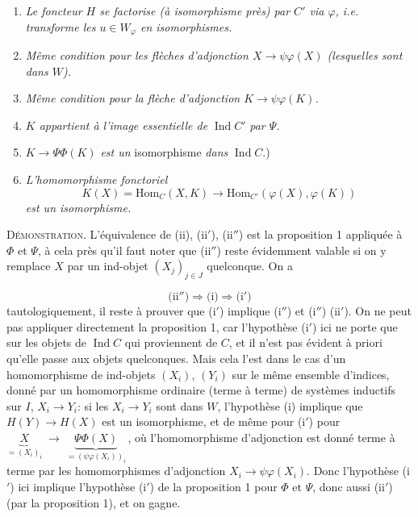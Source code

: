 \documentclass[11pt]{article}
\newcommand{\printedpage}[1]{\marginpar{\footnotesize p.~#1}}
\newcommand{\msp}[1]{\marginpar{\footnotesize [#1]}}
\newcommand{\Hom}{\mathrm{Hom}}
\newcommand{\Ind}{\operatorname{Ind}}
\begin{document}
\begin{enumerate}[label={}]
\item[(i)] \textit{Le foncteur $H$ se factorise (à isomorphisme près) par $C'$ via $\varphi$, i.e. transforme les $u \in W_\varphi$ en isomorphismes.}
\printedpage{27}
\item[(i$'$)] \textit{Même condition pour les flèches d'adjonction $X \longrightarrow \psi\varphi(X)$ (lesquelles sont dans $W$).}
\item[(i$''$)] \textit{Même condition pour la flèche d'adjonction $K \longrightarrow \psi\varphi(K)$.}
\item[(ii)] \textit{$K$ appartient à l'image essentielle de} $\Ind C'$ \textit{par $\Psi$.}
\item[(ii$'$)] $K \longrightarrow \Psi\Phi(K)$ \textit{est un} isomorphisme \textit{dans} $\Ind C$.) %
\item[(ii$''$)] \textit{L'homomorphisme fonctoriel}
\[
K(X) = \Hom_C(X,K) \longrightarrow \Hom_{C'}(\varphi(X),\varphi(K))
\]
 \textit{est un isomorphisme.}
\end{enumerate}

\textsc{Démonstration.} L'équivalence de (ii), (ii$'$), (ii$''$) est la proposition 1 appliquée à $\Phi$ et $\Psi$, à cela près qu'il faut noter que (ii$''$) reste évidemment valable si on y remplace $X$ par un ind-objet $(X_j)_{j\in J}$ quelconque. On a

\noindent\msp{page 42}%
\[
\text{(ii$''$)} \Longrightarrow \text{(i)} \Longrightarrow \text{(i$'$)}
\]
tautologiquement, il reste à prouver que (i$'$) implique (i$''$) et (i$''$) (ii$'$). On ne peut pas appliquer directement la proposition 1, car l'hypothèse (i$'$) ici ne porte que sur les objets de $\Ind C$ qui proviennent de $C$, et il n'est pas évident à priori qu'elle passe aux objets quelconques. Mais cela l'est dans le cas d'un homomorphisme de ind-objets $(X_i)$, $(Y_i)$ sur le même ensemble d'indices, donné par un homomorphisme ordinaire (terme à terme) de systèmes inductifs sur $I$, $X_i \longrightarrow Y_i$: si les $X_i \longrightarrow Y_i$ sont dans $W$, l'hypothèse (i) implique que $H(Y) \longrightarrow H(X)$ est un isomorphisme, et de même pour (i$'$) pour $\underbrace{X}_{=(X_i)_i} \;\longrightarrow\; \underbrace{\Psi\Phi(X)}_{=(\psi\varphi(X_i))_i}$\,, où l'homomorphisme d'adjonction est donné terme à terme par les homomorphismes d'adjonction $X_i \longrightarrow \psi\varphi(X_i)$. Donc l'hypothèse (i$'$) ici implique l'hypothèse (i$'$) de la proposition 1 pour $\Phi$ et $\Psi$, donc aussi (ii$'$) (par la proposition 1), et on gagne. %
\end{document}

